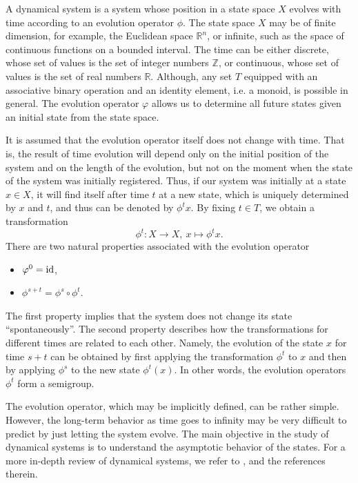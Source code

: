 A dynamical system is a system whose position in a state space $X$ evolves with
time according to an evolution operator $\phi$. The state space $X$ may be of
finite dimension, for example, the Euclidean space $\mathbb R^n$, or infinite,
such as the space of continuous functions on a bounded interval. The time can
be either discrete, whose set of values is the set of integer numbers $\mathbb
Z$, or continuous, whose set of values is the set of real numbers $\mathbb R$.
Although, any set $T$ equipped with an associative binary operation and an
identity element, i.e. a monoid, is possible in general. The evolution operator
$\varphi$ allows us to determine all future states given an initial state from
the state space.

It is assumed that the evolution operator itself does not change with time.
That is, the result of time evolution will depend only on the initial position
of the system and on the length of the evolution, but not on the moment when
the state of the system was initially registered. Thus, if our system was
initially at a state $x \in X$, it will find itself after time $t$ at a new
state, which is uniquely determined by $x$ and $t$, and thus can be denoted by
$\phi^t x$. By fixing $t\in T$, we obtain a transformation 
\[
    \phi^t \colon X \rightarrow X,\  x \mapsto \phi^t x.
\]
There are two natural properties associated with the evolution operator
\begin{itemize}
    \item $\varphi^0 = \operatorname{id}$,
    \item $\phi^{s+t} = \phi^s \circ \phi^t$.
\end{itemize}
The first property implies that the system does not change its state
``spontaneously''. The second property describes how the transformations for
different times are related to each other. Namely, the evolution of the state
$x$ for time $s + t$ can be obtained by first applying the transformation
$\phi^t$  to $x$ and then by applying $\phi^s$ to the new state $\phi^t(x)$.
In other words, the evolution operators $\phi^t$ form a semigroup. 

The evolution operator, which may be implicitly defined, can be rather simple.
However, the long-term behavior as time goes to infinity may be very difficult to
predict by just letting the system evolve. The main objective in the study of
dynamical systems is to understand the asymptotic behavior of the states. For a
more in-depth review of dynamical systems, we refer to \cite{Kuznetsov2004}, and
the references therein.

